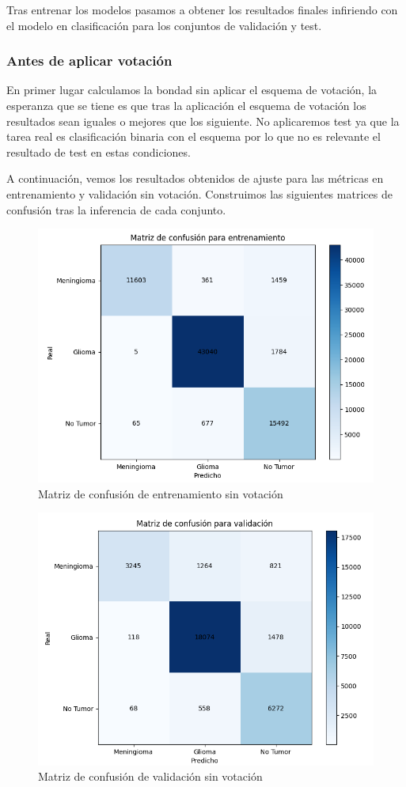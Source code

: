 Tras entrenar los modelos pasamos a obtener los resultados finales infiriendo con el modelo en clasificación para los conjuntos de validación y test.

\subsubsection{Antes de aplicar votación}

En primer lugar calculamos la bondad sin aplicar el esquema de votación, la esperanza que se tiene es que tras la aplicación el esquema de votación los resultados sean iguales o mejores que los siguiente. No aplicaremos test ya que la tarea real es clasificación binaria con el esquema por lo que no es relevante el resultado de test en estas condiciones. 

A continuación, vemos los resultados obtenidos de ajuste para las métricas en entrenamiento y validación sin votación. Construimos las siguientes matrices de confusión tras la inferencia de cada conjunto.
 
\begin{figure}[H]
	\centering
	\includegraphics[width=0.8\linewidth]{imagenes/task1_results_train.png}
	\caption{Matriz de confusión de entrenamiento sin votación}
\end{figure}

\begin{figure}[H]
	\centering
	\includegraphics[width=0.8\linewidth]{imagenes/task1_results_validation.png}
	\caption{Matriz de confusión de validación sin votación}
\end{figure}

